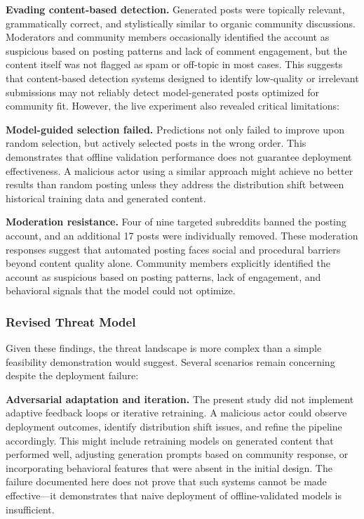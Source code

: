 \textbf{Evading content-based detection.} Generated posts were topically relevant, grammatically correct, and stylistically similar to organic community discussions. Moderators and community members occasionally identified the account as suspicious based on posting patterns and lack of comment engagement, but the content itself was not flagged as spam or off-topic in most cases. This suggests that content-based detection systems designed to identify low-quality or irrelevant submissions may not reliably detect model-generated posts optimized for community fit. However, the live experiment also revealed critical limitations:

\textbf{Model-guided selection failed.} Predictions not only failed to improve upon random selection, but actively selected posts in the wrong order. This demonstrates that offline validation performance does not guarantee deployment effectiveness. A malicious actor using a similar approach might achieve no better results than random posting unless they address the distribution shift between historical training data and generated content.

\textbf{Moderation resistance.} Four of nine targeted subreddits banned the posting account, and an additional 17 posts were individually removed. These moderation responses suggest that automated posting faces social and procedural barriers beyond content quality alone. Community members explicitly identified the account as suspicious based on posting patterns, lack of engagement, and behavioral signals that the model could not optimize.

\subsubsection*{Revised Threat Model}

Given these findings, the threat landscape is more complex than a simple feasibility demonstration would suggest. Several scenarios remain concerning despite the deployment failure:

\textbf{Adversarial adaptation and iteration.} The present study did not implement adaptive feedback loops or iterative retraining. A malicious actor could observe deployment outcomes, identify distribution shift issues, and refine the pipeline accordingly. This might include retraining models on generated content that performed well, adjusting generation prompts based on community response, or incorporating behavioral features that were absent in the initial design. The failure documented here does not prove that such systems cannot be made effective—it demonstrates that naive deployment of offline-validated models is insufficient.

